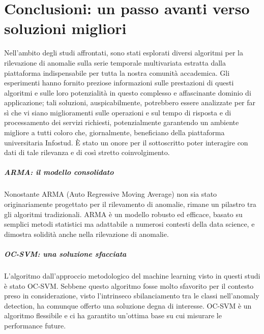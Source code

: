     

\chapter{Conclusioni: un passo avanti verso soluzioni migliori}
        Nell'ambito degli studi affrontati, sono stati esplorati diversi algoritmi per la rilevazione di anomalie 
        sulla serie temporale multivariata estratta dalla piattaforma indispensabile per tutta la nostra comunità accademica. 
        Gli esperimenti hanno fornito preziose informazioni sulle prestazioni di 
        questi algoritmi e sulle loro potenzialità in questo complesso e affascinante dominio di applicazione; tali soluzioni,
        auspicabilmente, potrebbero essere analizzate per far sì che vi siano miglioramenti sulle operazioni e sul 
        tempo di risposta e di processamento dei servizi richiesti, potenzialmente garantendo un ambiente migliore a tutti 
        coloro che, giornalmente, beneficiano della piattaforma universitaria Infostud. 
        È stato un onore per il sottoscritto poter interagire con dati di tale rilevanza e di così
        stretto coinvolgimento.

        \paragraph{ARMA: il modello consolidato} Nonostante ARMA\cite{arma} (Auto Regressive Moving Average) non sia stato 
        originariamente progettato per il rilevamento di anomalie, rimane un pilastro tra gli algoritmi tradizionali. 
        ARMA è un modello robusto ed efficace, basato su semplici metodi statistici ma adattabile a numerosi contesti della 
        data science, e dimostra solidità anche nella rilevazione di anomalie.

        \paragraph{OC-SVM: una soluzione sfacciata} L'algoritmo dall'approccio metodologico del machine learning visto 
        in questi studi è stato OC-SVM\cite{ocsvm}. Sebbene questo algoritmo fosse molto sfavorito per il contesto
        preso in considerazione, visto l'intrinseco sbilanciamento tra le classi nell'anomaly detection,
        ha comunque offerto una soluzione degna di interesse. OC-SVM è un algoritmo flessibile e ci ha garantito
        un'ottima base su cui misurare le performance future.


